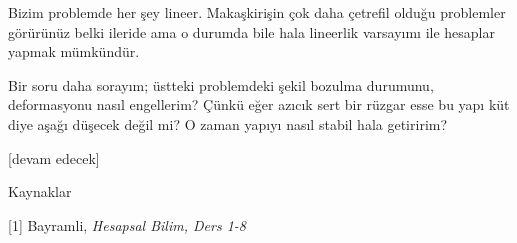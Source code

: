 \documentclass[12pt,fleqn]{article}\usepackage{../../common}
\begin{document}
Bizim problemde her şey lineer. Makaşkirişin çok daha çetrefil olduğu problemler
görürünüz belki ileride ama o durumda bile hala lineerlik varsayımı ile hesaplar
yapmak mümkündür.

Bir soru daha sorayım; üstteki problemdeki şekil bozulma durumunu, deformasyonu
nasıl engellerim? Çünkü eğer azıcık sert bir rüzgar esse bu yapı küt diye aşağı
düşecek değil mi? O zaman yapıyı nasıl stabil hala getiririm?














[devam edecek]

Kaynaklar

[1] Bayramli, {\em Hesapsal Bilim, Ders 1-8}
\end{document}
